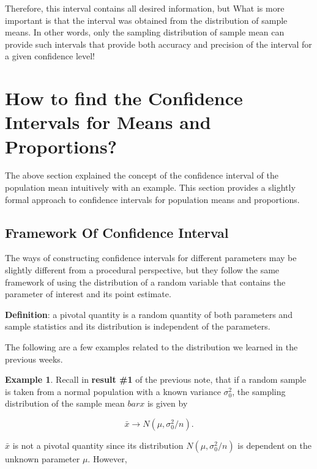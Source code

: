 \documentclass[
]{book}
\begin{document}
Therefore, this interval contains all desired information, but { What is more important is that the interval was obtained from the distribution of sample means.} In other words,{ only the sampling distribution of sample mean can provide such intervals that provide both accuracy and precision of the interval for a given confidence level! }

\hypertarget{how-to-find-the-confidence-intervals-for-means-and-proportions}{%
\section{How to find the Confidence Intervals for Means and Proportions?}\label{how-to-find-the-confidence-intervals-for-means-and-proportions}}

The above section explained the concept of the confidence interval of the population mean intuitively with an example. This section provides a slightly formal approach to confidence intervals for population means and proportions.

\hypertarget{framework-of-confidence-interval}{%
\subsection{Framework Of Confidence Interval}\label{framework-of-confidence-interval}}

The ways of constructing confidence intervals for different parameters may be slightly different from a procedural perspective, but they follow the same framework of using the distribution of a random variable that contains the parameter of interest and its point estimate.

\textbf{Definition}: a {pivotal quantity} is a random quantity of both parameters and sample statistics and its distribution is independent of the parameters.

The following are a few examples related to the distribution we learned in the previous weeks.

\textbf{Example 1}. Recall in \textbf{result \#1} of the previous note, that if a random sample is taken from a normal population with a known variance \(\sigma_0^2\), the sampling distribution of the sample mean \(bar{x}\) is given by

\[
\bar{x} \to N(\mu, \sigma_0^2/n).
\]

\(\bar{x}\) is not a pivotal quantity since its distribution \(N(\mu, \sigma_0^2/n)\) is dependent on the unknown parameter \(\mu\). However,
\end{document}
